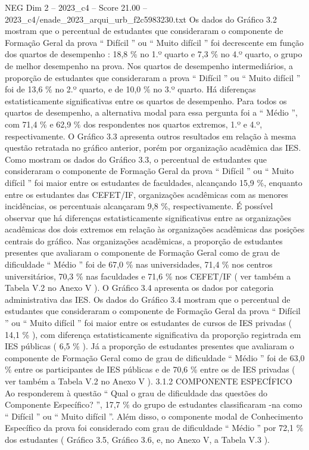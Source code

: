 \begin{textsample}{NEG Dim 2 – 2023\_c4 – Score 21.00 – 2023\_c4/enade\_2023\_arqui\_urb\_f2c5983230.txt}
Os dados do Gráfico 3.2 mostram que o percentual de estudantes que consideraram o componente de Formação Geral da prova “ Difícil ” ou “ Muito difícil ” foi decrescente em função dos quartos de desempenho : 18,8 \% no 1.º quarto e 7,3 \% no 4.º quarto, o grupo de melhor desempenho na prova.
Nos quartos de desempenho intermediários, a proporção de estudantes que consideraram a prova “ Difícil ” ou “ Muito difícil ” foi de 13,6 \% no 2.º quarto, e de 10,0 \% no 3.º quarto.
Há diferenças estatisticamente significativas entre os quartos de desempenho.
Para todos os quartos de desempenho, a alternativa modal para essa pergunta foi a “ Médio ”, com 71,4 \% e 62,9 \% dos respondentes nos quartos extremos, 1.º e 4.º, respectivamente.
O Gráfico 3.3 apresenta outros resultados em relação à mesma questão retratada no gráfico anterior, porém por organização acadêmica das IES.
Como mostram os dados do Gráfico 3.3, o percentual de estudantes que consideraram o componente de Formação Geral da prova “ Difícil ” ou “ Muito difícil ” foi maior entre os estudantes de faculdades, alcançando 15,9 \%, enquanto entre os estudantes das CEFET/IF, organizações acadêmicas com as menores incidências, os percentuais alcançaram 9,8 \%, respectivamente.
É possível observar que há diferenças estatisticamente significativas entre as organizações acadêmicas dos dois extremos em relação às organizações acadêmicas das posições centrais do gráfico.
Nas organizações acadêmicas, a proporção de estudantes presentes que avaliaram o componente de Formação Geral como de grau de dificuldade “ Médio ” foi de 67,0 \% nas universidades, 71,4 \% nos centros universitários, 70,3 \% nas faculdades e 71,6 \% nos CEFET/IF ( ver também a Tabela V.2 no Anexo V ).
O Gráfico 3.4 apresenta os dados por categoria administrativa das IES.
Os dados do Gráfico 3.4 mostram que o percentual de estudantes que consideraram o componente de Formação Geral da prova “ Difícil ” ou “ Muito difícil ” foi maior entre os estudantes de cursos de IES privadas ( 14,1 \% ), com diferença estatisticamente significativa da proporção registrada em IES públicas ( 6,5 \% ).
Já a proporção de estudantes presentes que avaliaram o componente de Formação Geral como de grau de dificuldade “ Médio ” foi de 63,0 \% entre os participantes de IES públicas e de 70,6 \% entre os de IES privadas ( ver também a Tabela V.2 no Anexo V ). 3.1.2 COMPONENTE ESPECÍFICO Ao responderem à questão “ Qual o grau de dificuldade das questões do Componente Específico? ”, 17,7 \% do grupo de estudantes classificaram -na como “ Difícil ” ou “ Muito difícil ”.
Além disso, o componente modal de Conhecimento Específico da prova foi considerado com grau de dificuldade “ Médio ” por 72,1 \% dos estudantes ( Gráfico 3.5, Gráfico 3.6, e, no Anexo V, a Tabela V.3 ).

\end{textsample}
